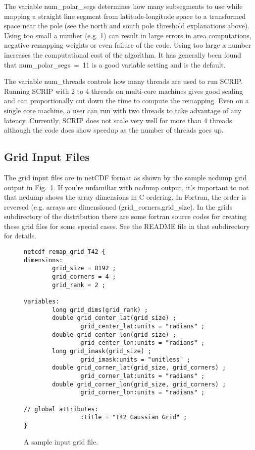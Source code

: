 \documentclass[12pt]{report}
\begin{document}
The variable num\_polar\_segs determines how many 
subsegments to use while mapping a straight line 
segment from latitude-longitude space to a transformed 
space near the pole (see the north and south pole
threshold explanations above). Using too small a 
number (e.g. 1) can result in large errors in area 
computations, negative remapping weights or even 
failure of the code. Using too large a number
increases the computational cost of the algorithm. 
It has generally been found that num\_polar\_segs~=~11 
is a good variable setting and is the default.

The variable num\_threads controls how many threads are used to run
SCRIP. Running SCRIP with 2 to 4 threads on multi-core machines gives
good scaling and can proportionally cut down the time to compute the
remapping. Even on a single core machine, a user can run with two
threads to take advantage of any latency. Currently, SCRIP does not
scale very well for more than 4 threads although the code does show
speedup as the number of threads goes up.

\subsection{Grid Input Files}

The grid input files are in netCDF format as shown
by the sample ncdump grid output in Fig.~\ref{fig:ncgrid}.
If you're unfamiliar with ncdump output, it's important to
not that ncdump shows the array dimensions in C ordering.
In Fortran, the order is reversed (e.g. arrays are
dimensioned (grid\_corners,grid\_size).
In the grids subdirectory of the distribution there
are some fortran source codes for creating these
grid files for some special cases.  See the README
file in that subdirectory for details.

\begin{figure}
\caption{A sample input grid file. \label{fig:ncgrid}}
\begin{verbatim}
netcdf remap_grid_T42 {
dimensions:
        grid_size = 8192 ;
        grid_corners = 4 ;
        grid_rank = 2 ;

variables:
        long grid_dims(grid_rank) ;
        double grid_center_lat(grid_size) ;
                grid_center_lat:units = "radians" ;
        double grid_center_lon(grid_size) ;
                grid_center_lon:units = "radians" ;
        long grid_imask(grid_size) ;
                grid_imask:units = "unitless" ;
        double grid_corner_lat(grid_size, grid_corners) ;
                grid_corner_lat:units = "radians" ;
        double grid_corner_lon(grid_size, grid_corners) ;
                grid_corner_lon:units = "radians" ;

// global attributes:
                :title = "T42 Gaussian Grid" ;
}
\end{verbatim}
\end{figure}
\end{document}
